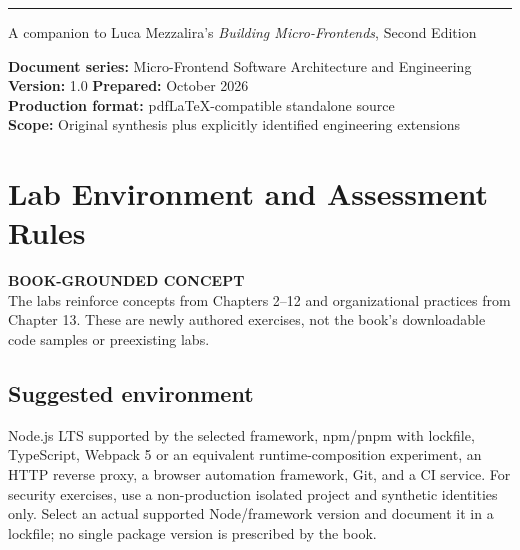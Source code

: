 \documentclass[11pt,letterpaper,oneside]{report}
\newcommand{\based}[1]{\begin{sourcebox}\textbf{BOOK-GROUNDED CONCEPT}\\#1\end{sourcebox}}
\begin{document}
\hypersetup{pageanchor=false}%
\begin{titlepage}\thispagestyle{empty}
\vspace{27pt}\noindent\color{blue}\rule{0.75\textwidth}{1.4pt}
\vspace{23pt}\par{\large\sffamily A companion to Luca Mezzalira's \emph{Building Micro-Frontends}, Second Edition}\par
\vfill\noindent\textbf{Document series:} Micro-Frontend Software Architecture and Engineering\\
\textbf{Version:} 1.0 \quad \textbf{Prepared:} October 2026\\
\textbf{Production format:} pdfLaTeX-compatible standalone source\\
\textbf{Scope:} Original synthesis plus explicitly identified engineering extensions
\end{titlepage}\hypersetup{pageanchor=true}
\tableofcontents\clearpage{}
\renewcommand{\chaptername}{LAB}\chapter*{Lab Environment and Assessment Rules}
\based{The labs reinforce concepts from Chapters 2--12 and organizational practices from Chapter 13. These are newly authored exercises, not the book's downloadable code samples or preexisting labs.}
\section*{Suggested environment}
Node.js LTS supported by the selected framework, npm/pnpm with lockfile, TypeScript, Webpack 5 or an equivalent runtime-composition experiment, an HTTP reverse proxy, a browser automation framework, Git, and a CI service. For security exercises, use a non-production isolated project and synthetic identities only. Select an actual supported Node/framework version and document it in a lockfile; no single package version is prescribed by the book.
\end{document}
